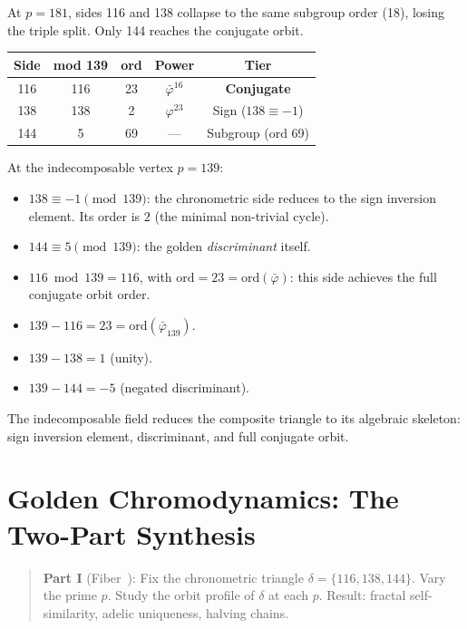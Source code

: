 At $p = 181$, sides 116 and 138 collapse to the same subgroup order (18),
losing the triple split. Only 144 reaches the conjugate orbit.

\begin{center}
\begin{tabular}{@{}ccccc@{}}
\toprule
Side & mod 139 & ord & Power & Tier \\
\midrule
116 & 116 & 23 & $\bar\varphi^{16}$ & \textbf{Conjugate} \\
138 & 138 &  2 & $\varphi^{23}$ & Sign ($138 \equiv -1$) \\
144 &   5 & 69 & --- & Subgroup (ord 69) \\
\bottomrule
\end{tabular}
\end{center}

At the indecomposable vertex $p = 139$:
\begin{itemize}
  \item $138 \equiv -1 \pmod{139}$: the chronometric side reduces to
    the sign inversion element. Its order is $2$ (the minimal non-trivial cycle).
  \item $144 \equiv 5 \pmod{139}$: the golden \emph{discriminant} itself.
  \item $116 \bmod 139 = 116$, with $\mathrm{ord} = 23 = \mathrm{ord}(\bar\varphi)$:
    this side achieves the full conjugate orbit order.
  \item $139 - 116 = 23 = \mathrm{ord}(\bar\varphi_{139})$.
  \item $139 - 138 = 1$ (unity).
  \item $139 - 144 = -5$ (negated discriminant).
\end{itemize}

The indecomposable field reduces the composite triangle to its
algebraic skeleton: sign inversion element, discriminant, and full
conjugate orbit.

\section{Golden Chromodynamics: The Two-Part Synthesis}
\label{sec:synthesis}

\begin{quote}
\textbf{Part I} (Fiber~\cite{dwm_fst}): Fix the chronometric triangle
$\delta = \{116, 138, 144\}$.
Vary the prime $p$. Study the orbit profile of $\delta$ at
each $p$. Result: fractal self-similarity, adelic uniqueness,
halving chains.
\end{quote}

